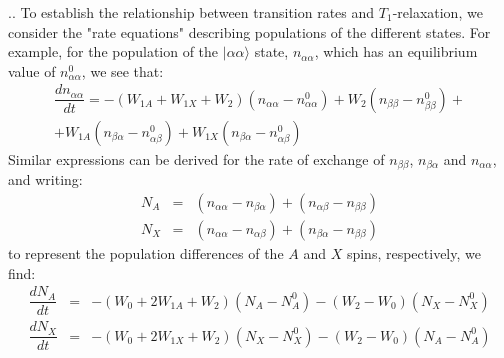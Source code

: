 \documentclass[handout]{beamer}
\begin{document}
\begin{frame}[shrink=5]{\thesection.\thesubsection. \insertsubsection}
  To establish the relationship between transition rates and $T_1$-relaxation, we consider the "rate equations" describing populations of the different states. For example, for the population of the $\mid \alpha \alpha \rangle$ state, $n_{\alpha \alpha}$, which has an equilibrium value of  $n_{\alpha \alpha}^0$, we see that:
  \begin{multline}
     \dfrac{d n_{\alpha \alpha}}{d t} = -(W_{1A} + W_{1X} + W_2)(n_{\alpha \alpha} - n_{\alpha \alpha}^0) + W_2 (n_{\beta \beta} - n_{\beta \beta}^0) + \\
     + W_{1A}(n_{\beta \alpha } - n_{\alpha \beta}^0 ) + W_{1X}(n_{\beta \alpha} - n_{\alpha \beta}^0 )
  \end{multline}
  Similar expressions can be derived for the rate of exchange of $n_{\beta \beta}$, $n_{\beta   \alpha}$ and $n_{\alpha \alpha}$, and writing:
  \begin{equation}
  \begin{array}{lcl}
     N_A &=& (n_{\alpha \alpha}  - n_{\beta \alpha} ) + (n_{ \alpha \beta}  - n_{\beta \beta} ) \\
     N_X &=& (n_{\alpha \alpha}  - n_{\alpha \beta } ) + (n_{  \beta \alpha}  - n_{\beta \beta} ) 
  \end{array}
  \end{equation}
  to represent the population differences of the $A$ and $X$ spins, respectively, we find:
  \begin{equation}
    \begin{array}{lcl}
      \dfrac{d N_A}{dt} &=& - (W_0 + 2W_{1A}+W_2)(N_A - N_A^0) - (W_2 - W_0)(N_X-N_X^0) \\
      \dfrac{d N_X}{dt} &=& - (W_0 + 2W_{1X}+W_2)(N_X - N_X^0) - (W_2 - W_0)(N_A-N_A^0) 
    \end{array}
  \end{equation}
\end{frame}
\end{document}
